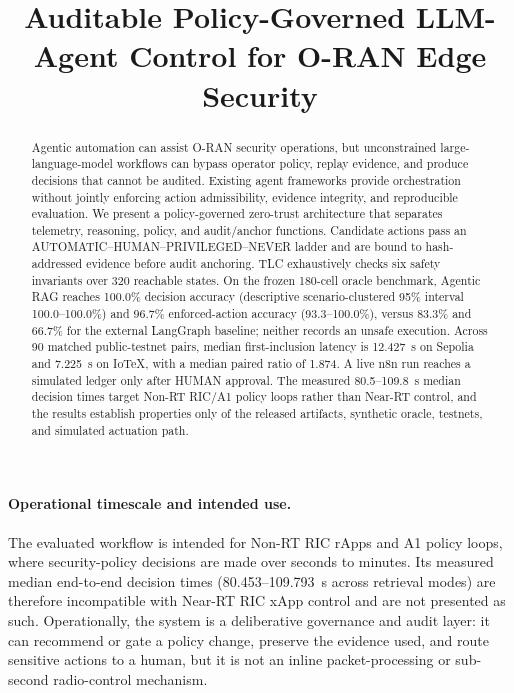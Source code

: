
\title{Auditable Policy-Governed LLM-Agent Control for O-RAN Edge Security}

\begin{abstract}
Agentic automation can assist O-RAN security operations, but unconstrained
large-language-model workflows can bypass operator policy, replay evidence, and
produce decisions that cannot be audited. Existing agent frameworks provide
orchestration without jointly enforcing action admissibility, evidence
integrity, and reproducible evaluation. We present a policy-governed zero-trust
architecture that separates telemetry, reasoning, policy, and audit/anchor
functions. Candidate actions pass an
AUTOMATIC--HUMAN--PRIVILEGED--NEVER ladder and are bound to hash-addressed
evidence before audit anchoring. TLC exhaustively checks six safety invariants
over 320 reachable states. On the frozen 180-cell oracle benchmark, Agentic RAG
reaches 100.0\% decision accuracy (descriptive scenario-clustered 95\% interval
100.0--100.0\%) and 96.7\% enforced-action accuracy (93.3--100.0\%), versus
83.3\% and 66.7\% for the external LangGraph baseline; neither records an unsafe
execution. Across 90 matched public-testnet pairs, median first-inclusion
latency is 12.427~s on Sepolia and 7.225~s on IoTeX, with a median paired ratio
of 1.874. A live n8n run reaches a simulated ledger only after HUMAN approval.
The measured 80.5--109.8~s median decision times target Non-RT RIC/A1 policy
loops rather than Near-RT control, and the results establish properties only of
the released artifacts, synthetic oracle, testnets, and simulated actuation
path.
\end{abstract}

\paragraph{Operational timescale and intended use.}
The evaluated workflow is intended for Non-RT RIC rApps and A1 policy loops,
where security-policy decisions are made over seconds to minutes. Its measured
median end-to-end decision times (80.453--109.793~s across retrieval modes) are
therefore incompatible with Near-RT RIC xApp control and are not presented as
such. Operationally, the system is a deliberative governance and audit layer:
it can recommend or gate a policy change, preserve the evidence used, and route
sensitive actions to a human, but it is not an inline packet-processing or
sub-second radio-control mechanism.

